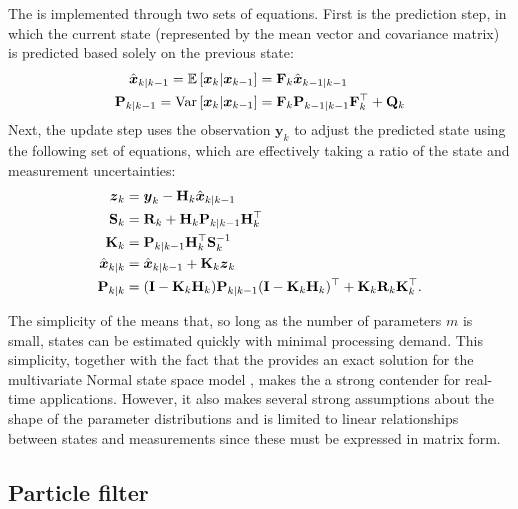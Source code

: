 The \kf{} is implemented through two sets of equations. First is the prediction step, in which the current state (represented by the mean vector and covariance matrix) is predicted based solely on the previous state:
\begin{equation}
\label{eq:ch2:kf_predict}
\begin{split}
\hat{\boldsymbol x}_{k|k-1} = \mathbb{E}\left[\boldsymbol x_k | \boldsymbol x_{k-1}\right]
    &= \mathbf{F}_k \hat{\boldsymbol x}_{k-1|k-1} \\
\mathbf{P}_{k|k-1} = \mathrm{Var}\left[\boldsymbol x_k | \boldsymbol x_{k-1}\right]
    &= \mathbf{F}_k \mathbf{P}_{k-1|k-1} \mathbf{F}_k^\top + \mathbf{Q}_k
\end{split}
\end{equation}
Next, the update step uses the observation $\boldsymbol{y}_k$ to adjust the predicted state using the following set of equations, which are effectively taking a ratio of the state and measurement uncertainties:
\begin{equation}
\label{eq:ch2:kf_update}
\begin{split}
\boldsymbol z_k &= \boldsymbol{y}_k - \mathbf{H}_k \hat{\boldsymbol x}_{k|k-1} \\
\mathbf{S}_k &= \mathbf{R}_k + \mathbf{H}_k \mathbf{P}_{k|k-1} \mathbf{H}_k^\top \\
\mathbf{K}_k &= \mathbf{P}_{k|k-1} \mathbf{H}_k^\top \mathbf{S}_k^{-1} \\
\hat{\boldsymbol x}_{k|k} &= \hat{\boldsymbol x}_{k|k-1} + \mathbf{K}_k \boldsymbol z_k \\
\mathbf{P}_{k|k} &= (\mathbf{I} - \mathbf{K}_k \mathbf{H}_k) \mathbf{P}_{k|k-1}
    (\mathbf{I} - \mathbf{K}_k \mathbf{H}_k)^\top + \mathbf{K}_k \mathbf{R}_k \mathbf{K}_k^\top.
\end{split}
\end{equation}


The simplicity of the \kf{} means that, so long as the number of parameters $m$ is small, states can be estimated quickly with minimal processing demand. This simplicity, together with the fact that the \kf{} provides an exact solution for the multivariate Normal state space model \citep{Anderson_1979}, makes the \kf{} a strong contender for real-time applications. However, it also makes several strong assumptions about the shape of the parameter distributions and is limited to linear relationships between states and measurements since these must be expressed in matrix form.



\subsection{Particle filter}
\label{sec:pf}

